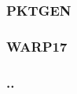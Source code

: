 \subsubsection{PKTGEN}\label{subsub:dpdk-pktgen}

\subsubsection{WARP17}\label{subsub:dpdk-WARP17}

\subsubsection{..}\label{}


